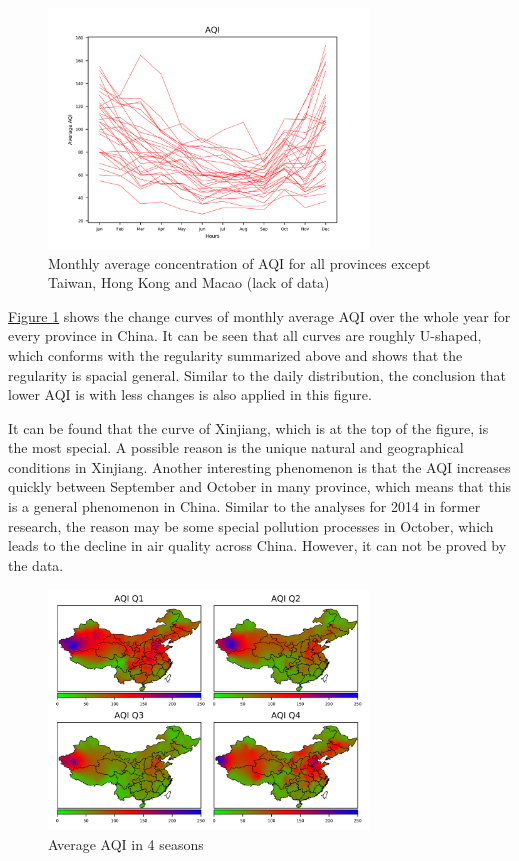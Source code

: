 \documentclass[letterpaper]{article}
\begin{document}
\begin{figure}[h]
  \includegraphics[width = 8.5cm]{monavg_pro_pltn.png}
  \caption{Monthly average concentration of AQI for all provinces except Taiwan, Hong Kong and Macao (lack of data)} 
  \label{figure:6}
\end{figure}

\hyperref[figure:6]{Figure \ref*{figure:6}} shows the change curves of monthly average AQI over the whole year for every province in China. It can be seen that all curves are roughly U-shaped, which conforms with the regularity summarized above and shows that the regularity is spacial general. Similar to the daily distribution, the conclusion that lower AQI is with less changes is also applied in this figure.

It can be found that the curve of Xinjiang, which is at the top of the figure, is the most special. A possible reason is the unique natural and geographical conditions in Xinjiang. Another interesting phenomenon is that the AQI increases quickly between September and October in many province, which means that this is a general phenomenon in China. Similar to the analyses for 2014 in former research, the reason may be some special pollution processes in October, which leads to the decline in air quality across China. However, it can not be proved by the data.

\begin{figure}[h]
  \includegraphics[width = 8.5cm]{AQI_season.png}
  \caption{Average AQI in 4 seasons}
  \label{figure:7}
\end{figure}
\end{document}
